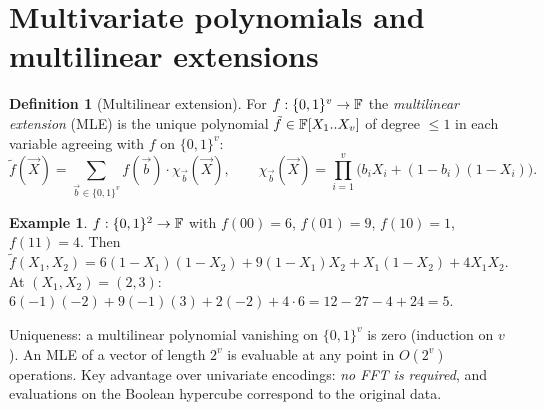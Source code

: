 \documentclass[11pt,a4paper]{report}
\theoremstyle{plain}
\theoremstyle{definition}
\newtheorem{definition}[theorem]{Definition}
\newtheorem{example}[theorem]{Example}
\theoremstyle{remark}
\begin{document}
\section{Multivariate polynomials and multilinear extensions}
\begin{definition}[Multilinear extension]
For $f:\{0,1\}^v\to\mathbb{F}$ the \emph{multilinear extension} (MLE) is the unique polynomial $\tilde f\in\mathbb{F}[X_1..X_v]$ of degree $\le1$ in each variable agreeing with $f$ on $\{0,1\}^v$:
\[\tilde f(\vec X)=\sum_{\vec b\in\{0,1\}^v}f(\vec b)\cdot\chi_{\vec b}(\vec X),\qquad\chi_{\vec b}(\vec X)=\prod_{i=1}^v\big(b_iX_i+(1-b_i)(1-X_i)\big).\]
\end{definition}
\begin{example}
$f:\{0,1\}^2\to\mathbb{F}$ with $f(00)=6$, $f(01)=9$, $f(10)=1$, $f(11)=4$. Then $\tilde f(X_1,X_2)=6(1-X_1)(1-X_2)+9(1-X_1)X_2+X_1(1-X_2)+4X_1X_2$. At $(X_1,X_2)=(2,3)$: $6(-1)(-2)+9(-1)(3)+2(-2)+4\cdot6=12-27-4+24=5$.
\end{example}
Uniqueness: a multilinear polynomial vanishing on $\{0,1\}^v$ is zero (induction on $v$). An MLE of a vector of length $2^v$ is evaluable at any point in $O(2^v)$ operations. Key advantage over univariate encodings: \emph{no FFT is required}, and evaluations on the Boolean hypercube correspond to the original data.
\end{document}
